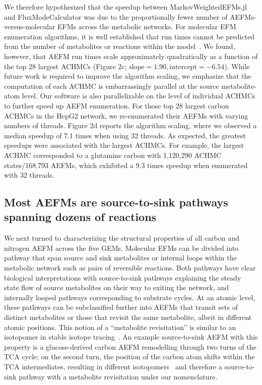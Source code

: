 \documentclass[12pt]{article}
\begin{document}
We therefore hypothesized that the speedup between MarkovWeightedEFMs.jl
and FluxModeCalculator was due to the proportionally fewer number of
AEFMs-versus-molecular EFMs across the metabolic networks. For molecular
EFM enumeration algorithms, it is well established that run times cannot
be predicted from the number of metabolites or reactions within the
model~\citep{UllahEhsan2020Tsef}. We found, however, that AEFM run times
scale approximately quadratically as a function of the top 28 largest
ACHMCs (Figure 2c; $\text{slope}=1.90, \text{intercept}=-6.54$). While
future work is required to improve the algorithm scaling, we emphasize
that the computation of each ACHMC is embarrassingly parallel at the
source metabolite-atom level. Our software is also parallelizable on the
level of individual ACHMCs to further speed up AEFM enumeration. For those
top 28 largest carbon ACHMCs in the HepG2 network, we re-enumerated their
AEFMs with varying numbers of threads. Figure 2d reports the algorithm
scaling, where we observed a median speedup of 7.1 times when using 32
threads. As expected, the greatest speedups were associated with the
largest ACHMCs. For example, the largest ACHMC corresponded to a glutamine
carbon with 1,120,290 ACHMC states/168,793 AEFMs, which exhibited a 9.3
times speedup when enumerated with 32 threads.

\fi

\subsection*{Most AEFMs are source-to-sink pathways spanning dozens of reactions}

We next turned to characterizing the structural properties of all carbon
and nitrogen AEFM across the five GEMs. Molecular EFMs can be divided into
pathway that span source and sink metabolites or internal loops within the
metabolic network such as pairs of reversible reactions. Both pathways
have clear biological interpretations with source-to-sink pathways
explaining the steady state flow of source metabolites on their way to
exiting the network, and internally looped pathways corresponding to
substrate cycles. At an atomic level, these pathways can be subclassified
further into AEFMs that transit sets of distinct metabolites or those that
revisit the same metabolite, albeit in different atomic positions. This notion
of a ``metabolite revisitation'' is similar to an isotopomer in stable isotope
tracing~\citep{AntoniewiczMaciekR2018Agt1}. An example source-to-sink AEFM with
this property is a glucose-derived carbon AEFM remodelling through two turns of
the TCA cycle; on the second turn, the position of the carbon atom shifts
within the TCA intermediates, resulting in different
isotopomers~\citep{DuanLikun20221tas} and therefore a source-to-sink pathway
with a metabolite revisitation under our nomenclature.
\end{document}
